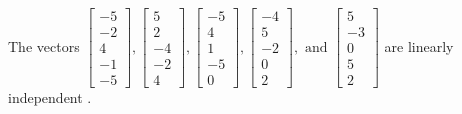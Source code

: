 \begin{exercise}
\begin{exerciseStatement}
  \end{exerciseStatement}
  \begin{exerciseAnswer}
   The vectors \(\left[\begin{array}{r}
-5 \\
-2 \\
4 \\
-1 \\
-5
\end{array}\right] , \left[\begin{array}{r}
5 \\
2 \\
-4 \\
-2 \\
4
\end{array}\right] , \left[\begin{array}{r}
-5 \\
4 \\
1 \\
-5 \\
0
\end{array}\right] , \left[\begin{array}{r}
-4 \\
5 \\
-2 \\
0 \\
2
\end{array}\right] , \text{ and } \left[\begin{array}{r}
5 \\
-3 \\
0 \\
5 \\
2
\end{array}\right]\) are 
  	 linearly independent  .
  


  \end{exerciseAnswer}
\end{exercise}